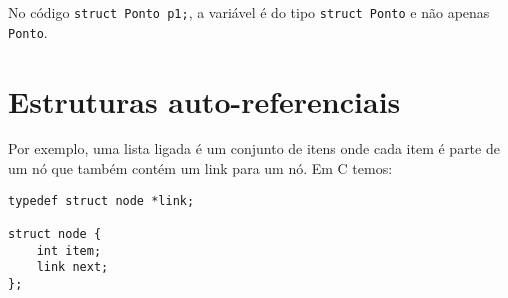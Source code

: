 \documentclass{article}
\begin{document}
No código \texttt{struct Ponto p1;}, a variável é do tipo \texttt{struct Ponto} e não apenas \texttt{Ponto}. 

\section{Estruturas auto-referenciais}

Por exemplo, uma lista ligada é um conjunto de itens onde cada item é parte de um nó que também contém um link para um nó. Em C temos:

\begin{verbatim}
typedef struct node *link;

struct node {
    int item;
    link next;
};
\end{verbatim}
\end{document}
